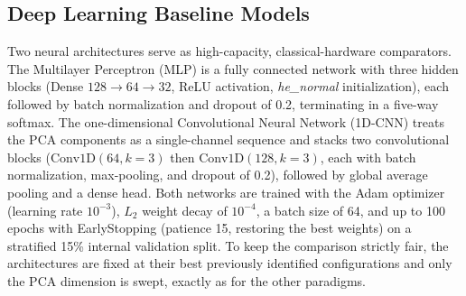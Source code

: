 \documentclass{ieeeaccess}
\begin{document}
\begin{table}[htbp]
\caption{Hyperparameter Grids of the Classical Baseline Models}
\label{tab:classical_grid}
\centering
{}
\end{table}

\subsection{Deep Learning Baseline Models}
\label{subsec:dl_methods}

Two neural architectures serve as high-capacity, classical-hardware comparators. The Multilayer Perceptron (MLP) is a fully connected network with three hidden blocks (Dense $128\!\rightarrow\!64\!\rightarrow\!32$, ReLU activation, \textit{he\_normal} initialization), each followed by batch normalization and dropout of 0.2, terminating in a five-way softmax. The one-dimensional Convolutional Neural Network (1D-CNN) treats the PCA components as a single-channel sequence and stacks two convolutional blocks ($\text{Conv1D}(64,k{=}3)$ then $\text{Conv1D}(128,k{=}3)$, each with batch normalization, max-pooling, and dropout of 0.2), followed by global average pooling and a dense head. Both networks are trained with the Adam optimizer (learning rate $10^{-3}$), $L_2$ weight decay of $10^{-4}$, a batch size of 64, and up to 100 epochs with EarlyStopping (patience 15, restoring the best weights) on a stratified 15\% internal validation split. To keep the comparison strictly fair, the architectures are fixed at their best previously identified configurations and only the PCA dimension is swept, exactly as for the other paradigms.
\end{document}

